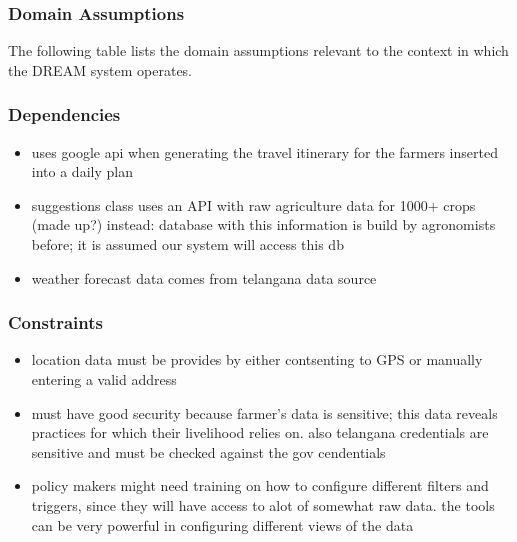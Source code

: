 \subsubsection{Domain Assumptions}
\begin{flushleft}
The following table lists the domain assumptions relevant to the context in which the DREAM system operates.
\end{flushleft} 

\begin{flushleft}

\end{flushleft}

\subsubsection{Dependencies}
\begin{flushleft}
\begin{itemize}

\item uses google api when generating the travel itinerary for the farmers inserted into a daily plan
\item suggestions class uses an API with raw agriculture data for 1000+ crops (made up?) instead: database with this information is build by agronomists before; it is assumed our system will access this db
\item weather forecast data comes from telangana data source 
\end{itemize}

\end{flushleft}

\subsubsection{Constraints}
\begin{flushleft}
\begin{itemize}
\item location data must be provides by either contsenting to GPS or manually entering a valid address
\item must have good security because farmer's data is sensitive; this data reveals practices for which their livelihood relies on. also telangana credentials are sensitive and must be checked against the gov cendentials 
\item policy makers might need training on how to configure different filters and triggers, since they will have access to alot of somewhat raw data. the tools can be very powerful in configuring different views of the data
\end{itemize}
\end{flushleft}
